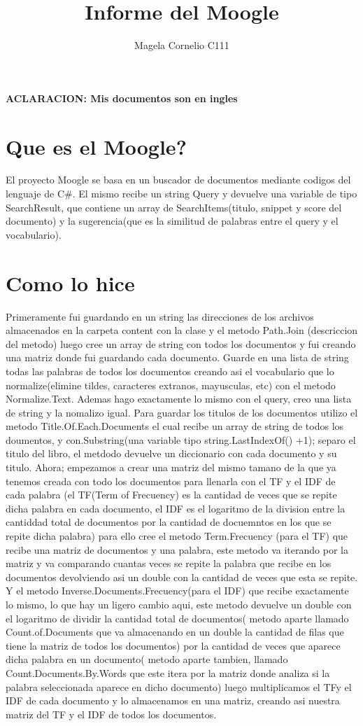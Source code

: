 \documentclass[12pt,a4paper]{article}
\begin{document}
\title{Informe del Moogle}
\author{Magela Cornelio C111}
\maketitle
\textbf{ ACLARACION: Mis documentos son en ingles}
\section*{Que es el Moogle?}
El proyecto Moogle se basa en un buscador de documentos mediante codigos del lenguaje de C\#. El mismo recibe un string Query y devuelve una variable de tipo SearchResult, que contiene un array de SearchItems(titulo, snippet y score del documento) y la sugerencia(que es la similitud de palabras entre el query y el vocabulario).
\section*{Como lo hice}
Primeramente fui guardando en un string las direcciones de  los archivos almacenados en la carpeta content con la clase y el metodo Path.Join (descriccion del metodo)  luego cree un array de string con todos los documentos y fui creando una matriz donde fui guardando cada documento.  Guarde en una lista de string todas las palabras de todos los documentos creando asi el vocabulario que lo normalize(elimine tildes, caracteres extranos, mayusculas, etc) con el metodo Normalize.Text. Ademas hago exactamente lo mismo con el query, creo una lista de string y la nomalizo igual.
\newline
Para guardar los titulos de los documentos utilizo el metodo 
Title.Of.Each.Documents el cual recibe un array de string de todos los doumentos, y con.Substring(una variable tipo string.LastIndexOf() +1); separo el titulo del libro, el metdodo devuelve un diccionario con cada documento y su titulo.
Ahora; empezamos a crear una matriz del mismo tamano de la que ya tenemos creada con todo los documentos para llenarla con el TF y el IDF de cada palabra  (el TF(Term of Frecuency) es la cantidad de veces que se repite dicha palabra en cada documento, el IDF es el logaritmo de  la division entre la cantiddad total de documentos por la cantidad de docuemntos en los que se repite dicha palabra) para ello cree el metodo Term.Frecuency (para el TF) que recibe una matriz de documentos y una palabra, este metodo va iterando por la matriz y va comparando cuantas veces se repite la palabra que recibe  en  los documentos devolviendo asi un double con la cantidad de veces que esta se repite. Y el metodo Inverse.Documents.Frecuency(para el IDF) que recibe exactamente lo mismo, lo que hay un ligero cambio aqui, este metodo  devuelve un double con el logaritmo de dividir la cantidad total de documentos( metodo aparte llamado Count.of.Documents que va almacenando en un double la cantidad de filas que tiene la matriz de todos los documentos) por la cantidad de veces que aparece dicha palabra en un documento( metodo aparte tambien, llamado Count.Documents.By.Words que este  itera por la matriz donde analiza si la palabra seleccionada aparece en dicho documento) luego multiplicamos el TFy el IDF de cada documento y lo almacenamos en una matriz, creando asi nuestra matriz del TF y el IDF de todos los documentos.
\end{document}

